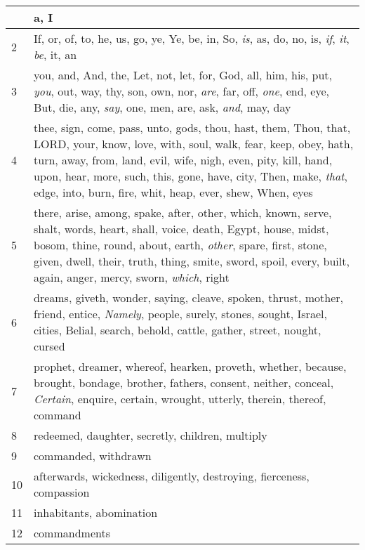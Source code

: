 \begin{longtable}{l|p{3.75in}}
\hline \hline
\endlastfoot
1 & a, I \\ \hline
2 & If, or, of, to, he, us, go, ye, Ye, be, in, So, \emph{is}, as, do, no, is, \emph{if}, \emph{it}, \emph{be}, it, an \\ \hline
3 & you, and, And, the, Let, not, let, for, God, all, him, his, put, \emph{you}, out, way, thy, son, own, nor, \emph{are}, far, off, \emph{one}, end, eye, But, die, any, \emph{say}, one, men, are, ask, \emph{and}, may, day \\ \hline
4 & thee, sign, come, pass, unto, gods, thou, hast, them, Thou, that, LORD, your, know, love, with, soul, walk, fear, keep, obey, hath, turn, away, from, land, evil, wife, nigh, even, pity, kill, hand, upon, hear, more, such, this, gone, have, city, Then, make, \emph{that}, edge, into, burn, fire, whit, heap, ever, shew, When, eyes \\ \hline
5 & there, arise, among, spake, after, other, which, known, serve, shalt, words, heart, shall, voice, death, Egypt, house, midst, bosom, thine, round, about, earth, \emph{other}, spare, first, stone, given, dwell, their, truth, thing, smite, sword, spoil, every, built, again, anger, mercy, sworn, \emph{which}, right \\ \hline
6 & dreams, giveth, wonder, saying, cleave, spoken, thrust, mother, friend, entice, \emph{Namely}, people, surely, stones, sought, Israel, cities, Belial, search, behold, cattle, gather, street, nought, cursed \\ \hline
7 & prophet, dreamer, whereof, hearken, proveth, whether, because, brought, bondage, brother, fathers, consent, neither, conceal, \emph{Certain}, enquire, certain, wrought, utterly, therein, thereof, command \\ \hline
8 & redeemed, daughter, secretly, children, multiply \\ \hline
9 & commanded, withdrawn \\ \hline
10 & afterwards, wickedness, diligently, destroying, fierceness, compassion \\ \hline
11 & inhabitants, abomination \\ \hline
12 & commandments \\ \hline
\end{longtable}






